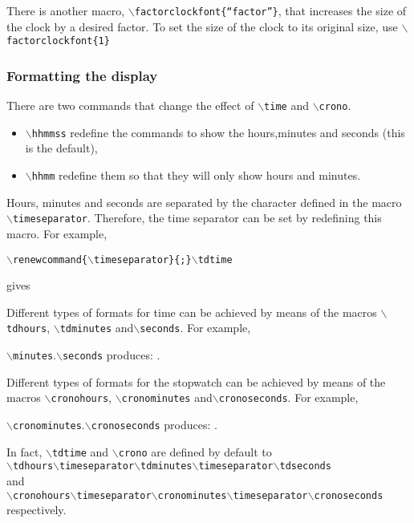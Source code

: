 \documentclass{article}
\begin{document}
\centerline{\textcolor{blue}{\Huge \tdtime} }

\smallskip

There is another macro,  \texttt{$\backslash$factorclockfont\{``factor''\}}, that increases the size of the clock
by a desired factor.  To set the size of the clock to its original size, use
\texttt{$\backslash$factorclockfont\{1\}}

\subsubsection{Formatting the display}
There are two commands that change the effect of \texttt{$\backslash$time} and
\texttt{$\backslash$crono}.
\begin{itemize}
\item \texttt{$\backslash$hhmmss} redefine the commands to show the hours,minutes and seconds (this is the default),
\item \texttt{$\backslash$hhmm} redefine them so that they will only show hours and minutes.
\end{itemize}

Hours, minutes and seconds are separated by the character defined in the macro \texttt{$\backslash$timeseparator}.
Therefore, the time separator can be set by redefining this macro.  For example,

\centerline{\texttt{$\backslash$renewcommand\{$\backslash$timeseparator\}\{;\}$\backslash$tdtime}}

gives

\centerline{\renewcommand{\timeseparator}{;}\tdtime}

Different types of formats for time can be achieved by means of the macros \texttt{$\backslash$tdhours}, \texttt{$\backslash$tdminutes} and\texttt{$\backslash$seconds}.  For example,

\noindent\texttt{$\backslash$minutes}.\texttt{$\backslash$seconds}
produces:  \quad \tdminutes.\tdseconds

Different types of formats for the stopwatch can be achieved by means of the macros \texttt{$\backslash$cronohours}, \texttt{$\backslash$cronominutes} and\texttt{$\backslash$cronoseconds}.  For example,

\noindent\texttt{$\backslash$cronominutes}.\texttt{$\backslash$cronoseconds}
produces:  \quad \cronominutes.\cronoseconds

In fact, \texttt{$\backslash$tdtime} and \texttt{$\backslash$crono} are defined by default to \\
\texttt{$\backslash$tdhours$\backslash$timeseparator$\backslash$tdminutes$\backslash$timeseparator$\backslash$tdseconds}\\ and \\
\texttt{$\backslash$cronohours$\backslash$timeseparator$\backslash$cronominutes$\backslash$timeseparator$\backslash$cronoseconds}\\ respectively.
\end{document}
